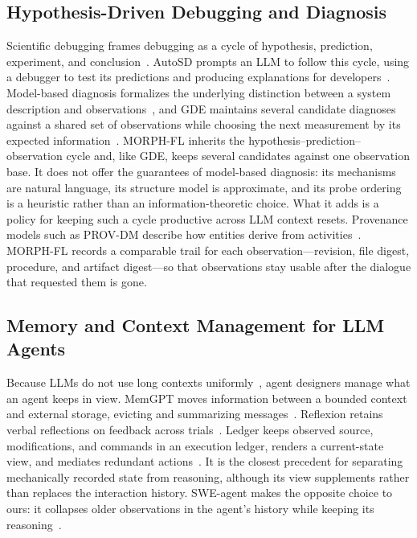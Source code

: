 \documentclass[letterpaper,journal]{IEEEtran}
\newcommand{\tool}{MORPH-FL}
\begin{document}
\subsection{Hypothesis-Driven Debugging and Diagnosis}
Scientific debugging frames debugging as a cycle of hypothesis, prediction, experiment, and conclusion~\cite{zeller2009}. AutoSD prompts an LLM to follow this cycle, using a debugger to test its predictions and producing explanations for developers~\cite{autosd2023}. Model-based diagnosis formalizes the underlying distinction between a system description and observations~\cite{reiter1987}, and GDE maintains several candidate diagnoses against a shared set of observations while choosing the next measurement by its expected information~\cite{gde1987}. \tool{} inherits the hypothesis--prediction--observation cycle and, like GDE, keeps several candidates against one observation base. It does not offer the guarantees of model-based diagnosis: its mechanisms are natural language, its structure model is approximate, and its probe ordering is a heuristic rather than an information-theoretic choice. What it adds is a policy for keeping such a cycle productive across LLM context resets. Provenance models such as PROV-DM describe how entities derive from activities~\cite{prov2013}. \tool{} records a comparable trail for each observation---revision, file digest, procedure, and artifact digest---so that observations stay usable after the dialogue that requested them is gone.

\subsection{Memory and Context Management for LLM Agents}
Because LLMs do not use long contexts uniformly~\cite{lostmiddle2024}, agent designers manage what an agent keeps in view. MemGPT moves information between a bounded context and external storage, evicting and summarizing messages~\cite{memgpt2024}. Reflexion retains verbal reflections on feedback across trials~\cite{reflexion2023}. Ledger keeps observed source, modifications, and commands in an execution ledger, renders a current-state view, and mediates redundant actions~\cite{ledger2026}. It is the closest precedent for separating mechanically recorded state from reasoning, although its view supplements rather than replaces the interaction history. SWE-agent makes the opposite choice to ours: it collapses older observations in the agent's history while keeping its reasoning~\cite{sweagent2024}.
\end{document}
